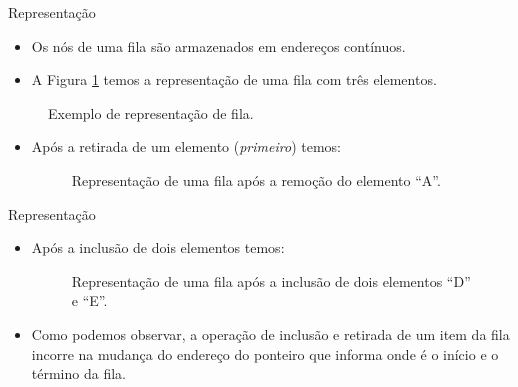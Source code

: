 \begin{frame}{Representação}
\begin{itemize}
	\item Os nós de uma fila são armazenados em endereços contínuos.	
	\item A Figura \ref{fig:fila-representacao} temos a representação de uma fila com três elementos.
\end{itemize}
\begin{figure}[ht]
				\centering
				\caption{Exemplo de representação de fila.}	
				\label{fig:fila-representacao}
			\end{figure} 
\begin{itemize}
	\item Após a retirada de um elemento (\textit{primeiro}) temos:
	\begin{figure}[ht]
				\centering
				\caption{Representação de uma fila após a remoção do elemento ``A''.}	
			\end{figure} 
\end{itemize}
\end{frame}


\begin{frame}{Representação}
\begin{itemize}
	\item Após a inclusão de dois elementos temos:
	\begin{figure}[ht]
				\centering
				\caption{Representação de uma fila após a inclusão de dois elementos ``D'' e ``E''.}	
			\end{figure} 
\end{itemize}
\begin{itemize}
	\item Como podemos observar, a operação de inclusão e retirada de um item da fila incorre na mudança do endereço do ponteiro que informa onde é o início e o término da fila.
\end{itemize}
\end{frame}

